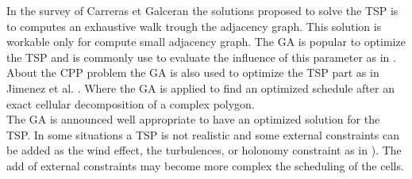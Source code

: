 	In the survey of Carreras et Galceran \citep{66*galceran2013} the solutions proposed to solve the TSP is to computes an exhaustive walk trough the adjacency graph. This solution is workable only for compute small adjacency graph. The GA is popular to optimize the TSP and is commonly use to evaluate the influence of this parameter as in \citep{68*muhlenbein1989} \citep{80*serpell2010}. About the CPP problem the GA is also used to optimize the TSP part as in Jimenez et al. \citep{217*jimenez2007}. Where the GA is applied to find an optimized schedule after an exact cellular decomposition of a complex polygon. \\
The GA is announced well appropriate to have an optimized solution for the TSP. 
In some situations a  TSP is not realistic and some external constraints can be added as the wind effect, the turbulences, or holonomy constraint as in \citep{56*davies2006,102*ware2016,66*galceran2013}). The add of external constraints may become more complex the scheduling  of the cells. 
 
 


 



